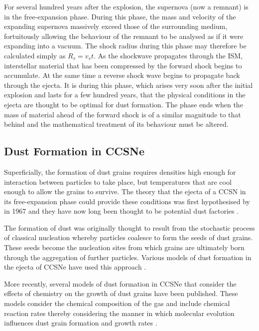 For several hundred years after the explosion, the supernova (now a remnant) is in the free-expansion phase. During this phase, the mass and velocity of the expanding supernova massively exceed those of the surrounding medium, fortuitously allowing the behaviour of the remnant to be analysed as if it were expanding into a vacuum.  The shock radius during this phase may therefore be calculated simply as $R_s = v_s t$.  As the shockwave propagates through the ISM, interstellar material that has been compressed by the forward shock begins to accumulate.  At the same time a reverse shock wave begins to propagate back through the ejecta.  It is during this phase, which arises very soon after the initial explosion and lasts for a few hundred years, that the physical conditions in the ejecta are thought to be optimal for dust formation.  The phase ends when the mass of material ahead of the forward shock is of a similar magnitude to that behind and the mathematical treatment of its behaviour must be altered.


\subsection{Dust Formation in CCSNe}

Superficially, the formation of dust grains requires densities high enough for interaction between particles to take place, but temperatures that are cool enough to allow the grains to survive.  The theory that the ejecta of a CCSN in its free-expansion phase could provide these conditions  was first hypothesised by \citeauthor{Cernuschi1967} in 1967 and they have now long been thought to be potential dust factories \citep{Hoyle1970, Kozasa1991, Todini2001}.  

The formation of dust was originally thought to result from the stochastic process of classical nucleation whereby particles coalesce to form the seeds of dust grains.  These seeds become the nucleation sites from which grains are ultimately born through the aggregation of further particles.  Various models of dust formation in the ejecta of CCSNe have used this approach \citep{Kozasa1989, Todini2001,Nozawa2003, Schneider2004}.  

More recently, several models of dust formation in CCSNe that consider the effects of chemistry on the growth of dust grains have been published.   These models consider the chemical composition of the gas and include chemical reaction rates thereby considering the manner in which molecular evolution influences dust grain formation and growth rates \citep{Cherchneff2009, Cherchneff2010, Sarangi2013, Sarangi2015}.

